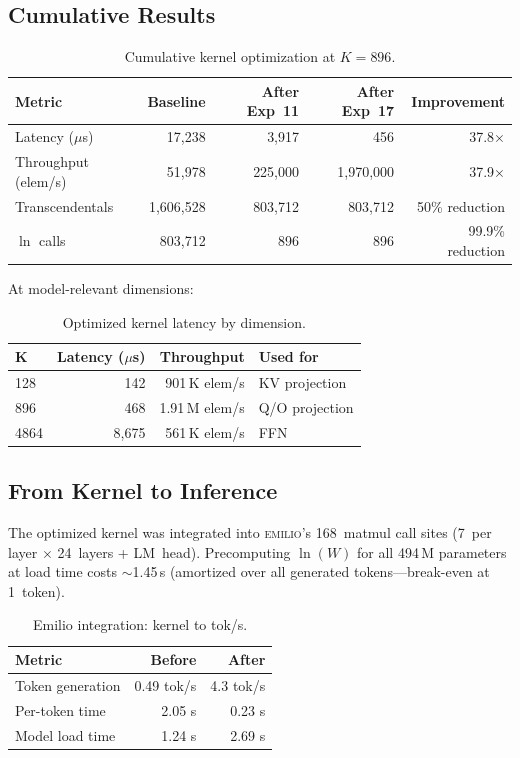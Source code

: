 \documentclass[acmsmall,nonacm]{acmart}
\begin{document}
\subsection{Cumulative Results}

\begin{table}[h]
\caption{Cumulative kernel optimization at $K{=}896$.}
\label{tab:cumulative}
\centering
\begin{tabular}{lrrrr}
\toprule
\textbf{Metric} & \textbf{Baseline} & \textbf{After Exp~11} & \textbf{After Exp~17} & \textbf{Improvement} \\
\midrule
Latency ($\mu$s) & 17,238 & 3,917 & 456 & 37.8$\times$ \\
Throughput (elem/s) & 51,978 & 225,000 & 1,970,000 & 37.9$\times$ \\
Transcendentals & 1,606,528 & 803,712 & 803,712 & 50\% reduction \\
$\ln$ calls & 803,712 & 896 & 896 & 99.9\% reduction \\
\bottomrule
\end{tabular}
\end{table}

At model-relevant dimensions:

\begin{table}[h]
\caption{Optimized kernel latency by dimension.}
\label{tab:kernel-dims}
\centering
\begin{tabular}{lrrl}
\toprule
\textbf{K} & \textbf{Latency ($\mu$s)} & \textbf{Throughput} & \textbf{Used for} \\
\midrule
128  & 142   & 901\,K elem/s & KV projection \\
896  & 468   & 1.91\,M elem/s & Q/O projection \\
4864 & 8,675 & 561\,K elem/s & FFN \\
\bottomrule
\end{tabular}
\end{table}

\subsection{From Kernel to Inference}

The optimized kernel was integrated into \textsc{emilio}'s 168~matmul
call sites (7~per layer $\times$ 24~layers + LM~head).  Precomputing
$\ln(W)$ for all 494\,M parameters at load time costs $\sim$1.45\,s
(amortized over all generated tokens---break-even at 1~token).

\begin{table}[h]
\caption{Emilio integration: kernel to tok/s.}
\label{tab:integration}
\centering
\begin{tabular}{lrr}
\toprule
\textbf{Metric} & \textbf{Before} & \textbf{After} \\
\midrule
Token generation & 0.49 tok/s & 4.3 tok/s \\
Per-token time & 2.05 s & 0.23 s \\
Model load time & 1.24 s & 2.69 s \\
\bottomrule
\end{tabular}
\end{table}
\end{document}
